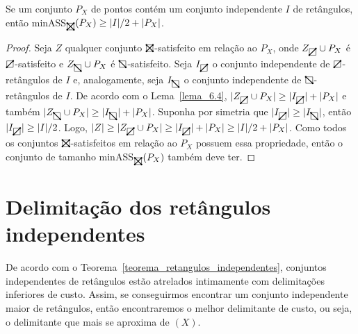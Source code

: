 \begin{theorem}\label{teorema_retangulos_independentes}
    Se um conjunto $P_X$ de pontos contém um conjunto independente $I$ de retângulos, então minASS$_{\recttotal}(P_X) \geq |I|/2 + |P_X|$.
\end{theorem}

\begin{proof}
    Seja $Z$ qualquer conjunto $\recttotal$-satisfeito em relação ao $P_X$, onde $Z_{\rectpos} \cup P_X$ é $\rectpos$-satisfeito e  $Z_{\rectneg} \cup P_X$ é $\rectneg$-satisfeito. Seja $I_{\rectpos}$ o conjunto independente de $\rectpos$-retângulos de $I$ e, analogamente, seja $I_{\rectneg}$ o conjunto independente de $\rectneg$-retângulos de $I$. De acordo com o Lema~\ref{lema_6.4}, $|Z_{\rectpos} \cup P_X| \geq |I_{\rectpos}| + |P_X|$ e também $|Z_{\rectneg} \cup P_X| \geq |I_{\rectneg}| + |P_X|$. Suponha por simetria que $|I_{\rectpos}| \geq |I_{\rectneg}|$, então $|I_{\rectpos}| \geq |I|/2$. Logo, $|Z| \geq |Z_{\rectpos} \cup P_X| \geq |I_{\rectpos}| + |P_X| \geq |I|/2 + |P_X|$. Como todos os conjuntos $\recttotal$-satisfeitos em relação ao $P_X$ possuem essa propriedade, então o conjunto de tamanho minASS$_{\recttotal}(P_X)$ também deve ter.
\end{proof}

\section{Delimitação dos retângulos independentes}

De acordo com o Teorema~\ref{teorema_retangulos_independentes}, conjuntos independentes de retângulos estão atrelados intimamente com delimitações inferiores de custo. Assim, se conseguirmos encontrar um conjunto independente maior de retângulos, então encontraremos o melhor delimitante de custo, ou seja, o delimitante que mais se aproxima de \OPT$(X)$.

